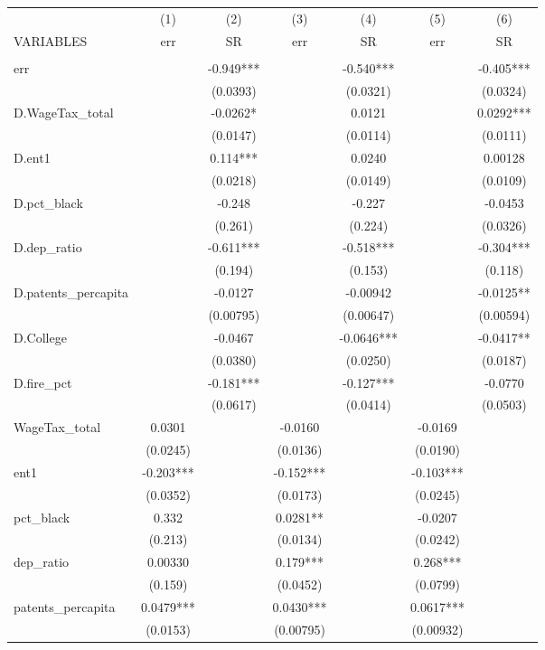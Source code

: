 \begin{tabular}{lcccccc} \hline
 & (1) & (2) & (3) & (4) & (5) & (6) \\
VARIABLES & err & SR & err & SR & err & SR \\ \hline
 &  &  &  &  &  &  \\
err &  & -0.949*** &  & -0.540*** &  & -0.405*** \\
 &  & (0.0393) &  & (0.0321) &  & (0.0324) \\
D.WageTax\_total &  & -0.0262* &  & 0.0121 &  & 0.0292*** \\
 &  & (0.0147) &  & (0.0114) &  & (0.0111) \\
D.ent1 &  & 0.114*** &  & 0.0240 &  & 0.00128 \\
 &  & (0.0218) &  & (0.0149) &  & (0.0109) \\
D.pct\_black &  & -0.248 &  & -0.227 &  & -0.0453 \\
 &  & (0.261) &  & (0.224) &  & (0.0326) \\
D.dep\_ratio &  & -0.611*** &  & -0.518*** &  & -0.304*** \\
 &  & (0.194) &  & (0.153) &  & (0.118) \\
D.patents\_percapita &  & -0.0127 &  & -0.00942 &  & -0.0125** \\
 &  & (0.00795) &  & (0.00647) &  & (0.00594) \\
D.College &  & -0.0467 &  & -0.0646*** &  & -0.0417** \\
 &  & (0.0380) &  & (0.0250) &  & (0.0187) \\
D.fire\_pct &  & -0.181*** &  & -0.127*** &  & -0.0770 \\
 &  & (0.0617) &  & (0.0414) &  & (0.0503) \\
WageTax\_total & 0.0301 &  & -0.0160 &  & -0.0169 &  \\
 & (0.0245) &  & (0.0136) &  & (0.0190) &  \\
ent1 & -0.203*** &  & -0.152*** &  & -0.103*** &  \\
 & (0.0352) &  & (0.0173) &  & (0.0245) &  \\
pct\_black & 0.332 &  & 0.0281** &  & -0.0207 &  \\
 & (0.213) &  & (0.0134) &  & (0.0242) &  \\
dep\_ratio & 0.00330 &  & 0.179*** &  & 0.268*** &  \\
 & (0.159) &  & (0.0452) &  & (0.0799) &  \\
patents\_percapita & 0.0479*** &  & 0.0430*** &  & 0.0617*** &  \\
 & (0.0153) &  & (0.00795) &  & (0.00932) &  \\

\end{tabular}
